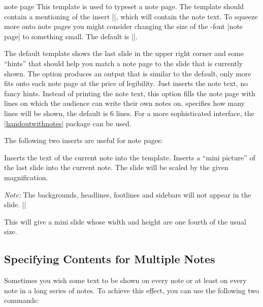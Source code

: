 \begin{element}{note page}\yes\yes\yes
  This template is used to typeset a note page.  The template should contain a mentioning of the insert |\insertnote|, which will contain the note text. To squeeze more onto note pages you might consider changing the size of the \beamer-font |note page| to something small. The default is |\small|.
  \begin{templateoptions}
    The default template shows the last slide in the upper right corner and some ``hints'' that should help you match a note page to the slide that is currently shown.
    The option produces an output that is similar to the default, only more fits onto each note page at the price of legibility.
    Just inserts the note text, no fancy hints.
    Instead of printing the note text, this option fills the note page with lines on which the audience can write their own notes on.  specifies how many lines will be shown, the default is 6 lines. For a more sophisticated interface, the \href{https://www.ctan.org/pkg/handoutwithnotes}{|handoutwithnotes|} package can be used.
  \end{templateoptions}
  The following two inserts are useful for note pages:
  \begin{itemize}
    \iteminsert{\insertnote}
    Inserts the text of the current note into the template.
    \iteminsert{\insertslideintonotes}
    Inserts a ``mini picture'' of the last slide into the current note. The slide will be scaled by the given magnification.

    \emph{Note:} The backgrounds, headlines, footlines and sidebars will not appear in the slide.
    \example
    ||

    This will give a mini slide whose width and height are one fourth of the usual size.
  \end{itemize}
\end{element}


\subsection{Specifying Contents for Multiple Notes}

Sometimes you wish some text to be shown on every note or at least on every note in a long series of notes. To achieve this effect, you can use the following two commands:

